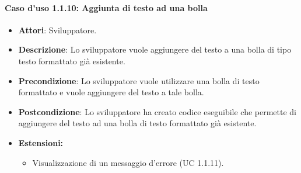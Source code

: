 \paragraph{Caso d'uso 1.1.10: Aggiunta di testo ad una bolla}
\begin{itemize}
\item\textbf{Attori}: Sviluppatore.
\item\textbf{Descrizione}: Lo sviluppatore vuole aggiungere del testo a una bolla di tipo testo formattato già esistente.
\item\textbf{Precondizione}: Lo sviluppatore vuole utilizzare una bolla di testo formattato e vuole aggiungere del testo a tale bolla.
\item\textbf{Postcondizione}: Lo sviluppatore ha creato codice eseguibile che permette di aggiungere del testo ad una bolla di testo formattato già esistente.
\item\textbf{Estensioni:}
	\begin{itemize}
		\item Visualizzazione di un messaggio d'errore (UC 1.1.11).
		\end{itemize}
\end{itemize}